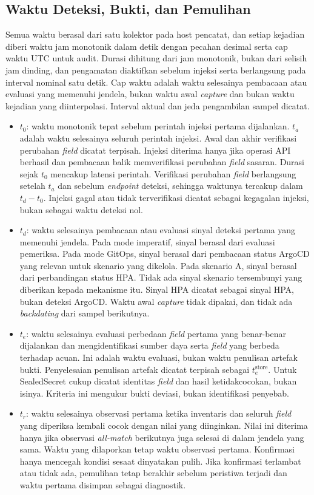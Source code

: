\subsection{Waktu Deteksi, Bukti, dan Pemulihan}

Semua waktu berasal dari satu kolektor pada host pencatat, dan setiap kejadian diberi waktu jam monotonik dalam detik dengan pecahan desimal serta cap waktu UTC untuk audit. Durasi dihitung dari jam monotonik, bukan dari selisih jam dinding, dan pengamatan diaktifkan sebelum injeksi serta berlangsung pada interval nominal satu detik. Cap waktu adalah waktu selesainya pembacaan atau evaluasi yang memenuhi jendela, bukan waktu awal \textit{capture} dan bukan waktu kejadian yang diinterpolasi. Interval aktual dan jeda pengambilan sampel dicatat.

\begin{itemize}
  \item $t_0$: waktu monotonik tepat sebelum perintah injeksi pertama dijalankan. $t_a$ adalah waktu selesainya seluruh perintah injeksi. Awal dan akhir verifikasi perubahan \textit{field} dicatat terpisah. Injeksi diterima hanya jika operasi API berhasil dan pembacaan balik memverifikasi perubahan \textit{field} sasaran. Durasi sejak $t_0$ mencakup latensi perintah. Verifikasi perubahan \textit{field} berlangsung setelah $t_a$ dan sebelum \textit{endpoint} deteksi, sehingga waktunya tercakup dalam $t_d-t_0$. Injeksi gagal atau tidak terverifikasi dicatat sebagai kegagalan injeksi, bukan sebagai waktu deteksi nol.
  \item $t_d$: waktu selesainya pembacaan atau evaluasi sinyal deteksi pertama yang memenuhi jendela. Pada mode imperatif, sinyal berasal dari evaluasi pemeriksa. Pada mode GitOps, sinyal berasal dari pembacaan status ArgoCD yang relevan untuk skenario yang dikelola. Pada skenario A, sinyal berasal dari perbandingan status HPA. Tidak ada sinyal skenario tersembunyi yang diberikan kepada mekanisme itu. Sinyal HPA dicatat sebagai sinyal HPA, bukan deteksi ArgoCD. Waktu awal \textit{capture} tidak dipakai, dan tidak ada \textit{backdating} dari sampel berikutnya.
  \item $t_e$: waktu selesainya evaluasi perbedaan \textit{field} pertama yang benar-benar dijalankan dan mengidentifikasi sumber daya serta \textit{field} yang berbeda terhadap acuan. Ini adalah waktu evaluasi, bukan waktu penulisan artefak bukti. Penyelesaian penulisan artefak dicatat terpisah sebagai $t_e^{\mathrm{store}}$. Untuk SealedSecret cukup dicatat identitas \textit{field} dan hasil ketidakcocokan, bukan isinya. Kriteria ini mengukur bukti deviasi, bukan identifikasi penyebab.
  \item $t_r$: waktu selesainya observasi pertama ketika inventaris dan seluruh \textit{field} yang diperiksa kembali cocok dengan nilai yang diinginkan. Nilai ini diterima hanya jika observasi \textit{all-match} berikutnya juga selesai di dalam jendela yang sama. Waktu yang dilaporkan tetap waktu observasi pertama. Konfirmasi hanya mencegah kondisi sesaat dinyatakan pulih. Jika konfirmasi terlambat atau tidak ada, pemulihan tetap berakhir sebelum peristiwa terjadi dan waktu pertama disimpan sebagai diagnostik.
\end{itemize}

